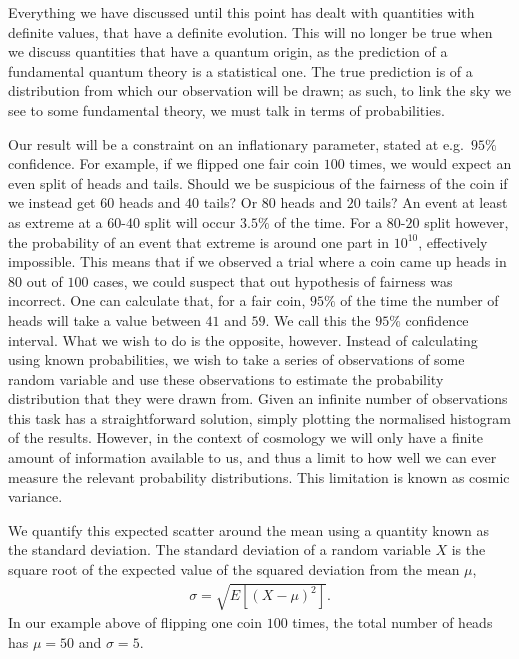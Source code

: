     Everything we have discussed until this point has dealt with quantities
    with definite values, that have a definite evolution. This will no longer
    be true when we discuss quantities that have a quantum origin, as
    the prediction of a fundamental quantum theory is a statistical one.
    The true prediction is of a distribution from which our observation will be drawn;
    as such, to link the sky we see to some fundamental theory,
    we must talk in terms of probabilities.


    Our result will be a constraint on an inflationary parameter, stated at e.g.\ $95\%$ confidence.
    For example, if we flipped one fair coin $100$ times, we would expect an even split of heads
    and tails. Should we be suspicious of the fairness of the coin if we instead get $60$ heads
    and $40$ tails? Or $80$ heads and $20$ tails? An event at least as extreme at a $60$-$40$ split
    will occur $3.5\%$ of the time. For a $80$-$20$ split however, the probability of an event that
    extreme is around one part in $10^{10}$, effectively impossible. This means that if we observed
    a trial where a coin came up heads in $80$ out of $100$ cases, we could suspect that out hypothesis
    of fairness was incorrect.
    One can calculate that, for a fair coin, $95\%$ of the time the number of heads will take a value
    between $41$ and $59$. We call this the $95\%$ confidence interval.
    What we wish to do is the opposite, however. Instead of calculating using known probabilities,
    we wish to take a series of observations of some random variable and use these observations
    to estimate the probability distribution that they were drawn from. Given an infinite number
    of observations this task has a straightforward solution, simply plotting the normalised
    histogram of the results. However, in the context of cosmology we will only have a finite amount
    of information available to us, and thus a limit to how well we can ever measure the relevant
    probability distributions. This limitation is known as cosmic variance.



    We quantify this expected scatter around the mean using a quantity known as the standard deviation.
    The standard deviation of a random variable $X$ is the square root of the expected value of the
    squared deviation from the mean $\mu$,
    \begin{align}
        \sigma = \sqrt{E\left[{(X-\mu)}^2\right]}.
    \end{align}
    In our example above of flipping one coin $100$ times, the total number of heads has $\mu=50$
    and $\sigma=5$.

